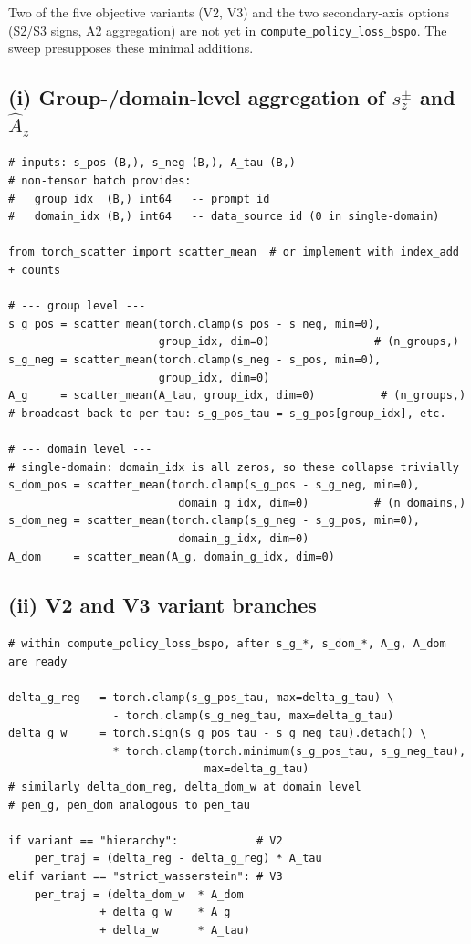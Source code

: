 \documentclass[11pt]{article}
\begin{document}
Two of the five objective variants (V2, V3) and the two secondary-axis
options (S2/S3 signs, A2 aggregation) are not yet in
\verb|compute_policy_loss_bspo|. The sweep presupposes these minimal
additions.

\subsection*{(i) Group-/domain-level aggregation of $s_z^\pm$ and $\hat A_z$}

\begin{lstlisting}
# inputs: s_pos (B,), s_neg (B,), A_tau (B,)
# non-tensor batch provides:
#   group_idx  (B,) int64   -- prompt id
#   domain_idx (B,) int64   -- data_source id (0 in single-domain)

from torch_scatter import scatter_mean  # or implement with index_add + counts

# --- group level ---
s_g_pos = scatter_mean(torch.clamp(s_pos - s_neg, min=0),
                       group_idx, dim=0)                # (n_groups,)
s_g_neg = scatter_mean(torch.clamp(s_neg - s_pos, min=0),
                       group_idx, dim=0)
A_g     = scatter_mean(A_tau, group_idx, dim=0)          # (n_groups,)
# broadcast back to per-tau: s_g_pos_tau = s_g_pos[group_idx], etc.

# --- domain level ---
# single-domain: domain_idx is all zeros, so these collapse trivially
s_dom_pos = scatter_mean(torch.clamp(s_g_pos - s_g_neg, min=0),
                          domain_g_idx, dim=0)          # (n_domains,)
s_dom_neg = scatter_mean(torch.clamp(s_g_neg - s_g_pos, min=0),
                          domain_g_idx, dim=0)
A_dom     = scatter_mean(A_g, domain_g_idx, dim=0)
\end{lstlisting}

\subsection*{(ii) V2 and V3 variant branches}

\begin{lstlisting}
# within compute_policy_loss_bspo, after s_g_*, s_dom_*, A_g, A_dom are ready

delta_g_reg   = torch.clamp(s_g_pos_tau, max=delta_g_tau) \
                - torch.clamp(s_g_neg_tau, max=delta_g_tau)
delta_g_w     = torch.sign(s_g_pos_tau - s_g_neg_tau).detach() \
                * torch.clamp(torch.minimum(s_g_pos_tau, s_g_neg_tau),
                              max=delta_g_tau)
# similarly delta_dom_reg, delta_dom_w at domain level
# pen_g, pen_dom analogous to pen_tau

if variant == "hierarchy":            # V2
    per_traj = (delta_reg - delta_g_reg) * A_tau
elif variant == "strict_wasserstein": # V3
    per_traj = (delta_dom_w  * A_dom
              + delta_g_w    * A_g
              + delta_w      * A_tau)
\end{lstlisting}
\end{document}
